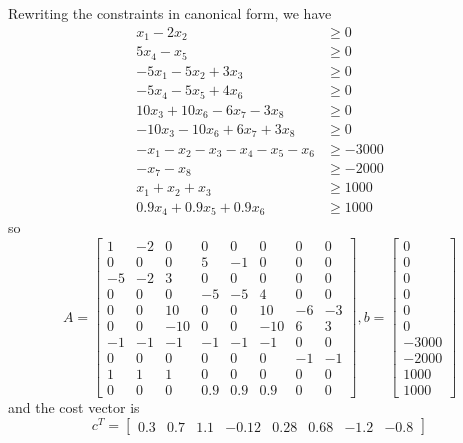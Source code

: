 \documentclass{article}
\begin{document}
\begin{enumerate}
\begin{soln}
			Rewriting the constraints in canonical form, we have
			\begin{align*}
				x_1-2x_2 &\ge 0 \\
				5x_4-x_5 &\ge 0 \\
				-5x_1-5x_2+3x_3 &\ge 0 \\
				-5x_4-5x_5+4x_6 &\ge 0 \\
				10x_3+10x_6-6x_7-3x_8 &\ge 0 \\
				-10x_3-10x_6+6x_7+3x_8 &\ge 0 \\
				-x_1-x_2-x_3-x_4-x_5-x_6 &\ge -3000 \\
				-x_7-x_8 &\ge -2000 \\
				x_1+x_2+x_3 &\ge 1000 \\
				0.9x_4+0.9x_5+0.9x_6 &\ge 1000
			\end{align*}
			so \[A=\begin{bmatrix}
					1 & -2 & 0 & 0 & 0 & 0 & 0 & 0 \\
					0 & 0 & 0 & 5 & -1 & 0 & 0 & 0 \\
					-5 & -2 & 3 & 0 & 0 & 0 & 0 & 0 \\
					0 & 0 & 0 & -5 & -5 & 4 & 0 & 0 \\
					0 & 0 & 10 & 0 & 0 & 10 & -6 & -3 \\	
					0 & 0 & -10 & 0 & 0 & -10 & 6 & 3 \\
					-1 & -1 & -1 & -1 & -1 & -1 & 0 & 0 \\
					0 & 0 & 0 & 0 & 0 & 0 & -1 & -1 \\
					1 & 1 & 1 & 0 & 0 & 0 & 0 & 0 \\
					0 & 0 & 0 & 0.9 & 0.9 & 0.9 & 0 & 0
			\end{bmatrix}, b=\begin{bmatrix}
					0 \\ 0 \\ 0 \\ 0 \\ 0 \\ 0 \\ -3000 \\ -2000 \\ 1000 \\ 1000
			\end{bmatrix}\] and the cost vector is \[c^T = \begin{bmatrix}
					0.3 & 0.7 & 1.1 & -0.12 & 0.28 & 0.68 & -1.2 & -0.8
			\end{bmatrix}\]
		\end{soln}

\end{enumerate}
\end{document}
